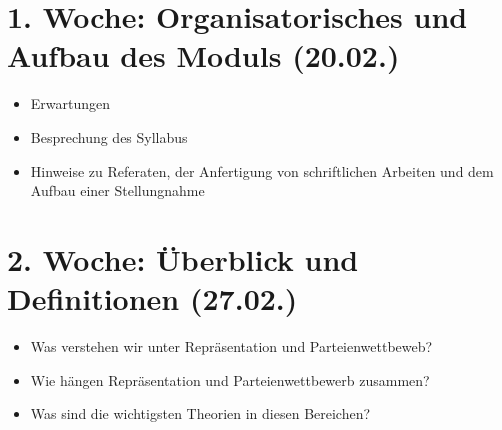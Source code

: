 \documentclass[abstract=on,parskip=full,headings=standardclasses,fontsize=11pt,paper=a4]{scrartcl}
\begin{document}
\renewcommand{\cftdot}{} %
\tableofcontents



\section{1. Woche: Organisatorisches und Aufbau des Moduls (20.02.)}

\begin{itemize}
\renewcommand\labelitemi{--}
\item Erwartungen
\item Besprechung des Syllabus
\item Hinweise zu Referaten, der Anfertigung von schriftlichen Arbeiten und dem Aufbau einer Stellungnahme
\end{itemize}

\section{2. Woche: Überblick  und Definitionen (27.02.)}

\begin{itemize}
\renewcommand\labelitemi{--}
\item Was verstehen wir unter Repräsentation und Parteienwettbeweb? 
\item Wie hängen Repräsentation und Parteienwettbewerb zusammen?
\item Was sind die wichtigsten Theorien in diesen Bereichen?
\end{itemize}
\end{document}
